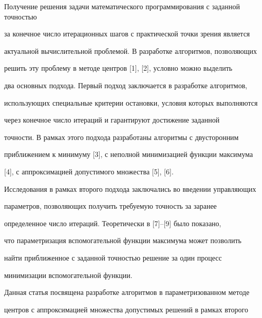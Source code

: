 

\maketitle


\label{begin}








Получение решения задачи математического программирования с заданной точностью


за конечное число итерационных шагов с практической точки зрения является 


актуальной вычислительной проблемой. В разработке алгоритмов, позволяющих 


решить эту проблему в методе центров [1], [2], условно можно выделить 


два основных подхода. Первый подход заключается в разработке алгоритмов, 


использующих специальные критерии остановки, условия которых выполняются 


через конечное число итераций и гарантируют достижение заданной


точности. В рамках этого подхода разработаны алгоритмы с двусторонним 


приближением к минимуму [3], с неполной минимизацией функции максимума 


[4], с аппроксимацией допустимого множества [5], [6].





Исследования в рамках второго подхода заключались во введении управляющих


параметров, позволяющих получить требуемую точность за заранее


определенное число итераций. Теоретически в [7]--[9] было показано, 


что параметризация вспомогательной функции максимума может позволить


найти приближенное с заданной точностью решение за один процесс


минимизации вспомогательной функции. 





Данная статья посвящена разработке алгоритмов в параметризованном методе 


центров с аппроксимацией множества допустимых решений в рамках второго 


